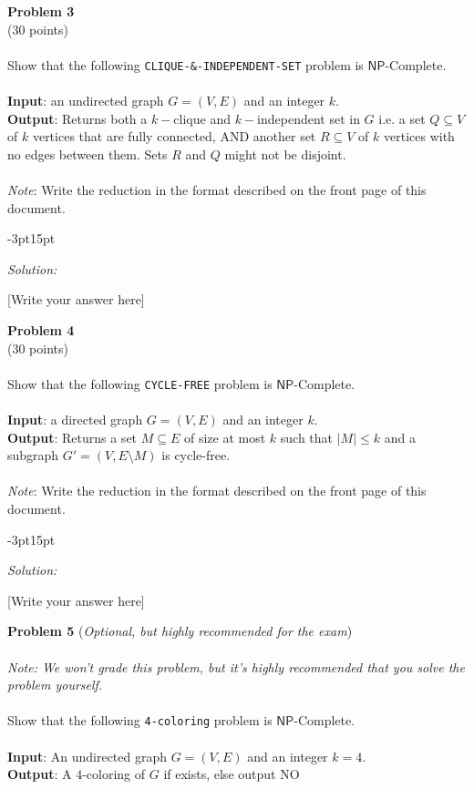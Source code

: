 \documentclass[12pt]{article}
\newcommand{\NP}{\mathsf{NP}}
\newenvironment{solution}{
\vspace{2pt}
\begin{adjustwidth}{-3pt}{15pt}
\begin{mdframed}
\textit{Solution:} \vspace{4pt}
}{
\end{mdframed}
\end{adjustwidth}
}
\begin{document}
\textbf{\large Problem 3}\\ {(30 points)} \\\\ 
Show that the following \texttt{CLIQUE-\&-INDEPENDENT-SET} problem is $\NP$-Complete. \\\\
\textbf{Input}: an undirected graph $G = (V,E)$ and an integer $k$.\\
\textbf{Output}: Returns both a $k-$clique and $k-$independent set in $G$ i.e. a set $Q \subseteq V$ of $k$ vertices that are fully connected, AND another set $R \subseteq V$ of $k$ vertices with no edges between them. Sets $R$ and $Q$ might not be disjoint. 
\\\\
\textit{Note}: Write the reduction in the format described on the front page of this document. \\

\begin{solution}
    [Write your answer here] \vspace{12pt} %
\end{solution}
\newpage

\textbf{\large Problem 4}\\ {(30 points)} \\\\ 
Show that the following \texttt{CYCLE-FREE} problem is $\NP$-Complete. \\\\
\textbf{Input}: a directed graph $G = (V,E)$ and an integer $k$.\\
\textbf{Output}: Returns a set $M \subseteq E$ of size at most $k$ such that $|M| \leq k$ and a subgraph $G' = (V, E \texttt{\textbackslash}M)$ is cycle-free. 
\\\\
\textit{Note}: Write the reduction in the format described on the front page of this document. \\

\begin{solution}
    [Write your answer here] \vspace{12pt} %
\end{solution}
\newpage

\textbf{\large Problem 5} (\textit{\large Optional, but highly recommended for the exam})\\\\ 
\textit{Note: We won't grade this problem, but it's highly recommended that you solve the problem yourself.} \\\\ 
Show that the following \texttt{4-coloring} problem is $\NP$-Complete.
\\\\
\textbf{Input}: An undirected graph $G=(V,E)$ and an integer $k = 4$. \\
\textbf{Output}: A $4$-coloring of $G$ if exists, else output NO

\\\\
\newpage
    
\end{document}
